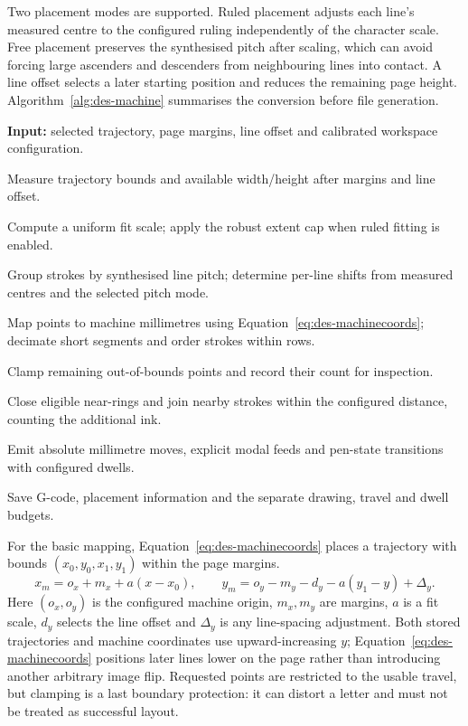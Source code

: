 Two placement modes are supported. Ruled placement adjusts each line's measured centre to the configured ruling independently of the character scale. Free placement preserves the synthesised pitch after scaling, which can avoid forcing large ascenders and descenders from neighbouring lines into contact. A line offset selects a later starting position and reduces the remaining page height. Algorithm~\ref{alg:des-machine} summarises the conversion before file generation.
\begin{designalgorithm}
\caption{Trajectory placement and motion-file preparation}
\label{alg:des-machine}
\textbf{Input:} selected trajectory, page margins, line offset and calibrated workspace configuration.
\begin{designsteps}
\item Measure trajectory bounds and available width/height after margins and line offset.
\item Compute a uniform fit scale; apply the robust extent cap when ruled fitting is enabled.
\item Group strokes by synthesised line pitch; determine per-line shifts from measured centres and the selected pitch mode.
\item Map points to machine millimetres using Equation~\ref{eq:des-machinecoords}; decimate short segments and order strokes within rows.
\item Clamp remaining out-of-bounds points and record their count for inspection.
\item Close eligible near-rings and join nearby strokes within the configured distance, counting the additional ink.
\item Emit absolute millimetre moves, explicit modal feeds and pen-state transitions with configured dwells.
\item Save G-code, placement information and the separate drawing, travel and dwell budgets.
\end{designsteps}
\end{designalgorithm}

For the basic mapping, Equation~\ref{eq:des-machinecoords} places a trajectory with bounds $(x_0,y_0,x_1,y_1)$ within the page margins.
\begin{equation}
x_m=o_x+m_x+a(x-x_0),\qquad
y_m=o_y-m_y-d_y-a(y_1-y)+\Delta_y.
\label{eq:des-machinecoords}
\end{equation}
Here $(o_x,o_y)$ is the configured machine origin, $m_x,m_y$ are margins, $a$ is a fit scale, $d_y$ selects the line offset and $\Delta_y$ is any line-spacing adjustment. Both stored trajectories and machine coordinates use upward-increasing $y$; Equation~\ref{eq:des-machinecoords} positions later lines lower on the page rather than introducing another arbitrary image flip. Requested points are restricted to the usable travel, but clamping is a last boundary protection: it can distort a letter and must not be treated as successful layout.

